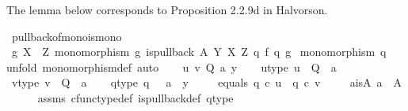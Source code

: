 \begin{isabellebody}
\begin{isamarkuptext}
The lemma below corresponds to Proposition 2.2.9d in Halvorson.%
\end{isamarkuptext}\isamarkuptrue%
\isamarkupfalse%
\ pullback{\isacharunderscore}{\kern0pt}of{\isacharunderscore}{\kern0pt}mono{\isacharunderscore}{\kern0pt}is{\isacharunderscore}{\kern0pt}mono{}{\isacharcolon}{\kern0pt}\isanewline
{}\ {\isachardoublequoteopen}g{\isacharcolon}{\kern0pt}\ X\ {\isasymrightarrow}\ Z{\isachardoublequoteclose}\ {\isachardoublequoteopen}monomorphism\ g{\isachardoublequoteclose}\ {\isachardoublequoteopen}is{\isacharunderscore}{\kern0pt}pullback\ A\ Y\ X\ Z\ q{}\ f\ q{}\ g{\isachardoublequoteclose}\isanewline
{}\ {\isachardoublequoteopen}monomorphism\ q{}{\isachardoublequoteclose}\ \isanewline
%
\isadelimproof
%
\endisadelimproof
%
\isatagproof
{}\isamarkupfalse%
{\isacharparenleft}{\kern0pt}unfold\ monomorphism{\isacharunderscore}{\kern0pt}def{}{\isacharcomma}{\kern0pt}\ auto{\isacharparenright}{\kern0pt}\isanewline
\ \ \isamarkupfalse%
\ u\ v\ Q\ a\ y\isanewline
\ \ \isamarkupfalse%
\ u{\isacharunderscore}{\kern0pt}type{\isacharcolon}{\kern0pt}\ {\isachardoublequoteopen}u\ {\isacharcolon}{\kern0pt}\ Q\ {\isasymrightarrow}\ a{\isachardoublequoteclose}\ \ \isanewline
\ \ \isamarkupfalse%
\ v{\isacharunderscore}{\kern0pt}type{\isacharcolon}{\kern0pt}\ {\isachardoublequoteopen}v\ {\isacharcolon}{\kern0pt}\ Q\ {\isasymrightarrow}\ a{\isachardoublequoteclose}\isanewline
\ \ \isamarkupfalse%
\ q{}{\isacharunderscore}{\kern0pt}type{\isacharcolon}{\kern0pt}\ {\isachardoublequoteopen}q{}\ {\isacharcolon}{\kern0pt}\ \ a\ {\isasymrightarrow}\ y{\isachardoublequoteclose}\ \isanewline
\ \ \isamarkupfalse%
\ equals{\isacharcolon}{\kern0pt}\ {\isachardoublequoteopen}q{}\ {\isasymcirc}\isactrlsub c\ u\ {\isacharequal}{\kern0pt}\ q{}\ {\isasymcirc}\isactrlsub c\ v{\isachardoublequoteclose}\ \isanewline
\isanewline
\ \ \isamarkupfalse%
\ a{\isacharunderscore}{\kern0pt}is{\isacharunderscore}{\kern0pt}A{\isacharcolon}{\kern0pt}\ {\isachardoublequoteopen}a\ {\isacharequal}{\kern0pt}\ A{\isachardoublequoteclose}\isanewline
\ \ \ \ \isamarkupfalse%
\ assms{\isacharparenleft}{\kern0pt}{}{\isacharparenright}{\kern0pt}\ cfunc{\isacharunderscore}{\kern0pt}type{\isacharunderscore}{\kern0pt}def\ is{\isacharunderscore}{\kern0pt}pullback{\isacharunderscore}{\kern0pt}def\ q{}{\isacharunderscore}{\kern0pt}type\ \ \isamarkupfalse%

\end{isabellebody}
